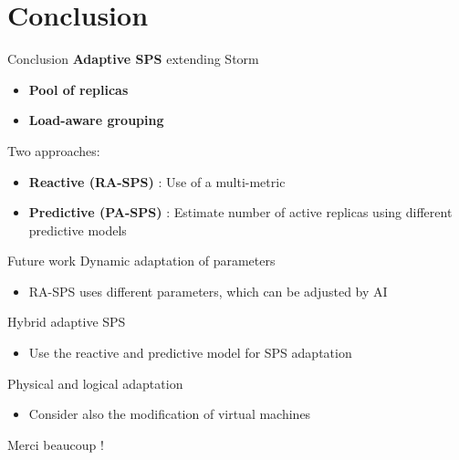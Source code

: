 \section[5]{Conclusion}

\begin{frame}{Conclusion}
\textbf{Adaptive SPS} extending Storm
\begin{itemize}
	\item \textbf{Pool of replicas}
	\item \textbf{Load-aware grouping}
\end{itemize}
	
Two approaches:
\begin{itemize}
	\item \textbf{Reactive (RA-SPS)} : Use of a multi-metric
	\item \textbf{Predictive (PA-SPS)} : Estimate number of active replicas using different predictive models
\end{itemize}
\end{frame}

\begin{frame}{Future work}
Dynamic adaptation of parameters
	\begin{itemize}
		\item RA-SPS uses different parameters, which can be adjusted by AI
	\end{itemize}
	
Hybrid adaptive SPS
	\begin{itemize}
		\item Use the reactive and predictive model for SPS adaptation
	\end{itemize}

Physical and logical adaptation
	\begin{itemize}
		\item Consider also the modification of virtual machines
	\end{itemize}
\end{frame}

\begin{frame}{}

	{\Huge Merci beaucoup !}
\end{frame}

